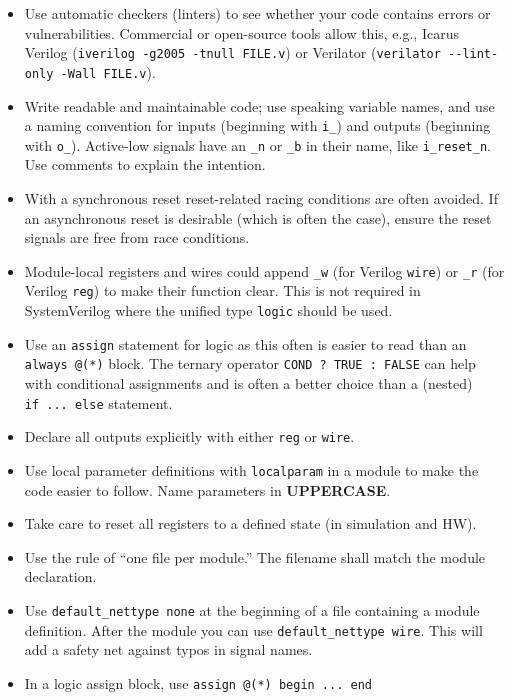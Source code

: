 \documentclass[
  a4paper,
  DIV=11,
  numbers=noendperiod]{scrartcl}
\providecommand{\tightlist}{%
  \setlength{\itemsep}{0pt}\setlength{\parskip}{0pt}}\usepackage{longtable,booktabs,array}
\begin{document}
\begin{itemize}
\tightlist
\item
  Use automatic checkers (linters) to see whether your code contains
  errors or vulnerabilities. Commercial or open-source tools allow this,
  e.g., Icarus Verilog (\texttt{iverilog\ -g2005\ -tnull\ FILE.v}) or
  Verilator (\texttt{verilator\ -\/-lint-only\ -Wall\ FILE.v}).
\item
  Write readable and maintainable code; use speaking variable names, and
  use a naming convention for inputs (beginning with \texttt{i\_}) and
  outputs (beginning with \texttt{o\_}). Active-low signals have an
  \texttt{\_n} or \texttt{\_b} in their name, like \texttt{i\_reset\_n}.
  Use comments to explain the intention.
\item
  With a synchronous reset reset-related racing conditions are often
  avoided. If an asynchronous reset is desirable (which is often the
  case), ensure the reset signals are free from race conditions.
\item
  Module-local registers and wires could append \texttt{\_w} (for
  Verilog \texttt{wire}) or \texttt{\_r} (for Verilog \texttt{reg}) to
  make their function clear. This is not required in SystemVerilog where
  the unified type \texttt{logic} should be used.
\item
  Use an \texttt{assign} statement for logic as this often is easier to
  read than an \texttt{always\ @(*)} block. The ternary operator
  \texttt{COND\ ?\ TRUE\ :\ FALSE} can help with conditional assignments
  and is often a better choice than a (nested) \texttt{if\ ...\ else}
  statement.
\item
  Declare all outputs explicitly with either \texttt{reg} or
  \texttt{wire}.
\item
  Use local parameter definitions with \texttt{localparam} in a module
  to make the code easier to follow. Name parameters in
  \textbf{UPPERCASE}.
\item
  Take care to reset all registers to a defined state (in simulation and
  HW).
\item
  Use the rule of ``one file per module.'' The filename shall match the
  module declaration.
\item
  Use \texttt{\textasciigrave{}default\_nettype\ none} at the beginning
  of a file containing a module definition. After the module you can use
  \texttt{\textasciigrave{}default\_nettype\ wire}. This will add a
  safety net against typos in signal names.
\item
  In a logic assign block, use \texttt{assign\ @(*)\ begin\ ...\ end}

\end{itemize}
\end{document}

